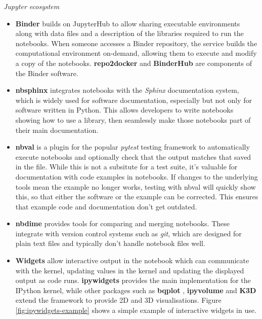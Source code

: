 \medskip\noindent\emph{Jupyter ecosystem}\label{jupyter-ecosystem}

\begin{itemize}
  \item \textbf{Binder} builds on JupyterHub to allow sharing executable
  environments along with data files and a description of the libraries
  required to run the notebooks. When someone accesses a Binder repository,
  the service builds the computational environment on-demand, allowing them to
  execute and modify a copy of the notebooks.
  \textbf{repo2docker} \cite{repo2docker} and \textbf{BinderHub} \cite{binder} are components of the Binder
  software.

  \item \textbf{nbsphinx} \cite{Nbsphinx} integrates notebooks with the \emph{Sphinx}
  documentation system, which is widely used for software documentation,
  especially but not only for software written in Python.
  This allows developers to write notebooks showing how to use a library,
  then seamlessly make those notebooks part of their main documentation.

  \item \textbf{nbval} \cite{nbval} is a plugin for the popular \emph{pytest} testing
  framework to automatically execute notebooks and optionally check that the
  output matches that saved in the file. While this is not a subsitute for a
  test suite, it's valuable for documentation with code examples in notebooks.
  If changes to the underlying tools mean the example no longer
  works, testing with nbval will quickly show this, so that either the software
  or the example can be corrected. This ensures that example code and
  documentation don't get outdated.

  \item \textbf{nbdime} \cite{nbdime} provides tools for comparing and merging notebooks.
  These integrate with version control systems such as \emph{git}, which
  are designed for plain text files and typically don't handle notebook files
  well.

  \item \textbf{Widgets} allow interactive output in the notebook which can
  communicate with the kernel, updating values in the kernel and updating the
  displayed output as code runs. \textbf{ipywidgets} \cite{ipywidgets} provides the main
  implementation for the IPython kernel, while other packages such as
  \textbf{bqplot} \cite{bqplot}, \textbf{ipyvolume} \cite{ipyvolume} and
  \textbf{K3D} \cite{K3D} extend the framework to provide 2D and 3D visualisations.
  Figure \ref{fig:ipywidgets-example} shows a simple example of interactive
  widgets in use.


\end{itemize}
